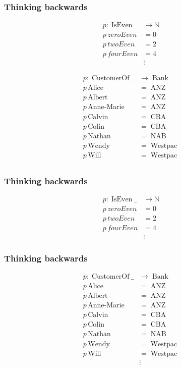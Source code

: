 \documentclass[
  xcolor={usenames,dvipsnames,svgnames},
  ]{beamer}
\DeclareMathOperator{\ANZ}{ANZ}
\DeclareMathOperator{\NAB}{NAB}
\DeclareMathOperator{\CBA}{CBA}
\DeclareMathOperator{\Westpac}{Westpac}
\DeclareMathOperator{\Bank}{Bank}
\DeclareMathOperator{\IsEven}{IsEven}
\DeclareMathOperator{\CustomerOf}{CustomerOf}
\newcommand{\N}{\ensuremath{\mathbb{N}}}
\begin{document}
\begin{frame}
\frametitle{Thinking backwards}
\begin{minipage}{.5\textwidth}
  \begin{align*}
    p : \IsEven \_  &\to \N\\
    p \, zeroEven &= 0 \\
    p \, twoEven  &= 2 \\
    p \, fourEven &= 4 \\
    &\vdots
  \end{align*}

\end{minipage}%
\begin{minipage}{.5\textwidth}
  \begin{align*}
      p : \CustomerOf \_       &\to \Bank\\
      p \, \textrm{Alice}      &= \ANZ \\
      p \, \textrm{Albert}     &= \ANZ \\
      p \, \textrm{Anne-Marie} &= \ANZ \\
      p \, \textrm{Calvin}     &= \CBA \\
      p \, \textrm{Colin}      &= \CBA \\
      p \, \textrm{Nathan}     &= \NAB \\
      p \, \textrm{Wendy}      &= \Westpac \\
      p \, \textrm{Will}       &= \Westpac \\
  \end{align*}
\end{minipage}
\end{frame}

\begin{frame}
\frametitle{Thinking backwards}
\begin{align*}
    p : \IsEven \_  &\to \N\\
    p \, zeroEven &= 0 \\
    p \, twoEven  &= 2 \\
    p \, fourEven &= 4 \\
    &\vdots
\end{align*}
\end{frame}

\begin{frame}
\frametitle{Thinking backwards}
\begin{align*}
    p : \CustomerOf \_       &\to \Bank\\
    p \, \textrm{Alice}      &= \ANZ \\
    p \, \textrm{Albert}     &= \ANZ \\
    p \, \textrm{Anne-Marie} &= \ANZ \\
    p \, \textrm{Calvin}     &= \CBA \\
    p \, \textrm{Colin}      &= \CBA \\
    p \, \textrm{Nathan}     &= \NAB \\
    p \, \textrm{Wendy}      &= \Westpac \\
    p \, \textrm{Will}       &= \Westpac \\
    &\vdots
\end{align*}
\end{frame}
\end{document}
